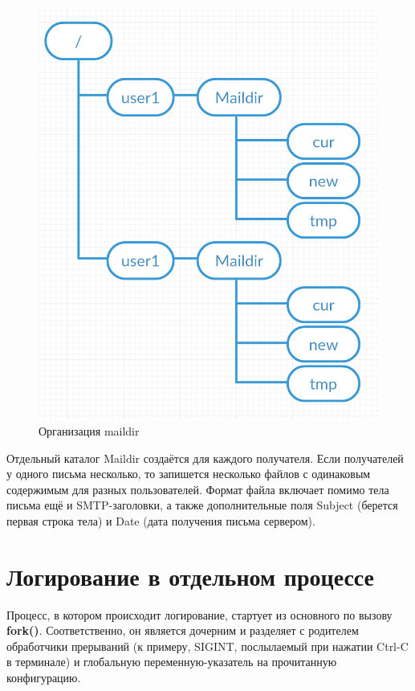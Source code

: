 \documentclass[a4paper,12pt]{report}
\begin{document}
\begin{figure}
\centering
\includegraphics[width=\textwidth]{diagramms/maildir.png}
\caption{Организация maildir}
\label{fig:maildir}
\end{figure}

Отдельный каталог Maildir создаётся для каждого получателя. Если получателей у одного письма несколько, то запишется несколько файлов с одинаковым содержимым для разных пользователей. Формат файла включает помимо тела письма ещё и SMTP-заголовки, а также дополнительные поля Subject (берется первая строка тела) и Date (дата получения письма сервером).


\section{Логирование в отдельном процессе}

Процесс, в котором происходит логирование, стартует из основного по вызову \textbf{fork()}. Соответственно, он является дочерним и разделяет с родителем обработчики прерываний (к примеру, SIGINT, послылаемый при нажатии Ctrl-C в терминале) и глобальную переменную-указатель на прочитанную конфигурацию.
\end{document}
